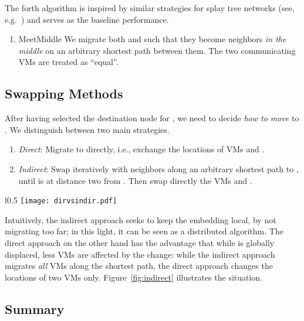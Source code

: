 \documentclass[conference]{IEEEtran}
\begin{document}
The forth algorithm is inspired by similar strategies for splay tree networks (see, e.g.~\cite{ipdps13}) and serves as the
baseline performance.
\begin{enumerate}
\item[4)]{\sc MeetMiddle}
 We migrate both  and  such that they become neighbors \emph{in the middle} on an arbitrary shortest path between them.
 The two communicating VMs are treated as ``equal''.
\end{enumerate}




\subsection{Swapping Methods}

After having selected the destination node  for , we need to decide \emph{how to move}  to .
We distinguish between two main strategies.
\begin{enumerate}
	\item \emph{Direct}: Migrate  to  directly, i.e., exchange the locations of VMs  and .

	\item \emph {Indirect}: Swap  iteratively with neighbors along an arbitrary shortest path to , until  is at distance
	two from . Then swap directly the VMs  and .
\end{enumerate}

\begin{wrapfigure}{l}{0.5\columnwidth}
	\centering
\centering
				\centering
				\texttt{[image: dirvsindir.pdf]}\\
				\caption{Direct vs Indirect Swapping}
				\label{fig:indirect}
\end{wrapfigure}
Intuitively, the indirect approach seeks to keep the embedding local, by not migrating  too far; in this light,
it can be seen as a distributed algorithm. The direct approach
on the other hand has the advantage that while  is globally displaced, less VMs are affected by the change:
while the indirect approach migrates \emph{all} VMs along the shortest path, the direct approach changes the locations of two VMs only.
Figure~\ref{fig:indirect} illustrates the situation.





\subsection{Summary}
\end{document}
